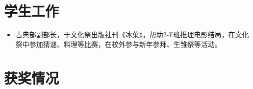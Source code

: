 \documentclass{resume}
\begin{document}
\section{\texorpdfstring{\faInfo}{} 学生工作}
\begin{itemize}[parsep=0.5ex]
  \item 古典部副部长，于文化祭出版社刊《冰菓》，帮助2-F班推理电影结局，在文化祭中参加猜谜、料理等比赛，在校外参与新年参拜、生雏祭等活动。

\end{itemize}

\section{\texorpdfstring{\faFile}{} 获奖情况}


\end{document}
